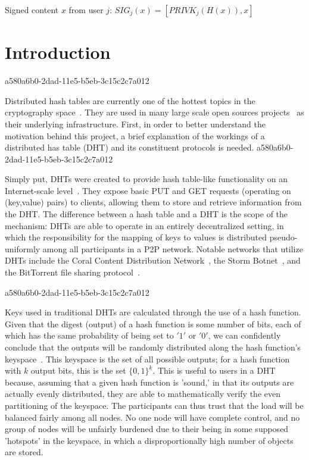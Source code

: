 \documentclass[12pt]{article}
\begin{document}
Signed content $x$ from user $j$: $SIG_j(x) = \left[ PRIVK_j( H(x) ), x \right]$

\section{Introduction}
a580a6b0-2dad-11e5-b5eb-3c15c2c7a012\par Distributed hash tables are currently one of the hottest topics in the cryptography space~\cite{Stoica:2001dj,Rowstron:2001ea,Ratnasamy:2001wn}. They are used in many large scale open sources projects~\cite{Freitas:2013tb,Xu:2010vs,Perfitt:2010fh} as their underlying infrastructure. First, in order to better understand the motivation behind this project, a brief explanation of the workings of a distributed has table (DHT) and its constituent protocols is needed.
a580a6b0-2dad-11e5-b5eb-3c15c2c7a012
\par Simply put, DHTs were created to provide hash table-like functionality on an Internet-scale level~\cite{Ratnasamy:2001wn}. They expose basic PUT and GET requests (operating on (key,value) pairs) to clients, allowing them to store and retrieve information from the DHT. The difference between a hash table and a DHT is the scope of the mechanism: DHTs are able to operate in an entirely decentralized setting, in which the responsibility for the mapping of keys to values is distributed pseudo-uniformly among all participants in a P2P network. Notable networks that utilize DHTs include the Coral Content Distribution Network~\cite{Freedman:2004vb}, the Storm Botnet~\cite{Holz:2008uk}, and the BitTorrent file sharing protocol~\cite{Cohen:y1_8mBnw}.

a580a6b0-2dad-11e5-b5eb-3c15c2c7a012\par Keys used in traditional DHTs are calculated through the use of a hash function. Given that the digest (output) of a hash function is some number of bits, each of which has the same probability of being set to $'1'$ or $'0'$, we can confidently conclude that the outputs will be randomly distributed along the hash function's keyspace~. This keyspace is the set of all possible outputs; for a hash function with $k$ output bits, this is the set $\{0,1\}^k$. This is useful to users in a DHT because, assuming that a given hash function is 'sound,' in that its outputs are actually evenly distributed, they are able to mathematically verify the even partitioning of the keyspace. The participants can thus trust that the load will be balanced fairly among all nodes. No one node will have complete control, and no group of nodes will be unfairly burdened due to their being in some supposed 'hotspots' in the keyspace, in which a disproportionally high number of objects are stored.~
\end{document}
